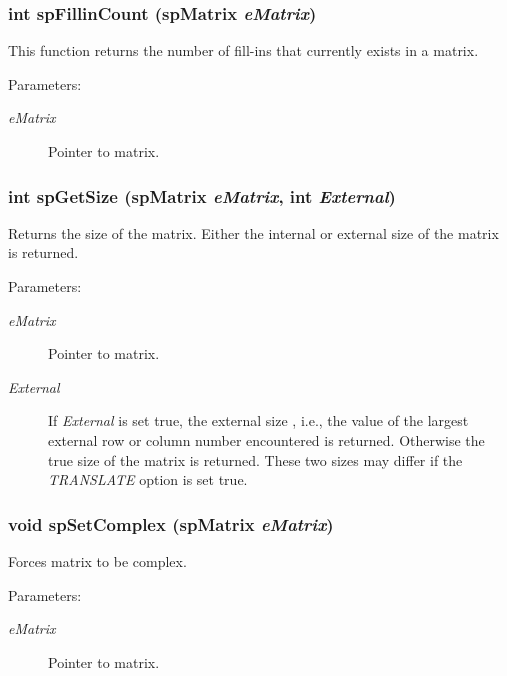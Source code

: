 \subsubsection{\setlength{\rightskip}{0pt plus 5cm}int sp\-Fillin\-Count ({\bf sp\-Matrix} {\em e\-Matrix})}\label{spAllocate_8c_a20}


This function returns the number of fill-ins that currently exists in a matrix.\begin{Desc}
\item[Parameters: ]\par
\begin{description}
\item[{\em 
e\-Matrix}]Pointer to matrix. \end{description}
\end{Desc}
\subsubsection{\setlength{\rightskip}{0pt plus 5cm}int sp\-Get\-Size ({\bf sp\-Matrix} {\em e\-Matrix}, int {\em External})}\label{spAllocate_8c_a17}


Returns the size of the matrix. Either the internal or external size of the matrix is returned.\begin{Desc}
\item[Parameters: ]\par
\begin{description}
\item[{\em 
e\-Matrix}]Pointer to matrix. \item[{\em 
External}]If {\em External} is set true, the external size , i.e., the value of the largest external row or column number encountered is returned. Otherwise the true size of the matrix is returned. These two sizes may differ if the {\em TRANSLATE} option is set true. \end{description}
\end{Desc}
\subsubsection{\setlength{\rightskip}{0pt plus 5cm}void sp\-Set\-Complex ({\bf sp\-Matrix} {\em e\-Matrix})}\label{spAllocate_8c_a19}


Forces matrix to be complex.\begin{Desc}
\item[Parameters: ]\par
\begin{description}
\item[{\em 
e\-Matrix}]Pointer to matrix. \end{description}
\end{Desc}
